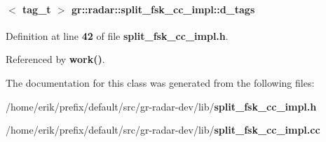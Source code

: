 \paragraph[{d\+\_\+tags}]{$<$ tag\+\_\+t $>$ gr\+::radar\+::split\+\_\+fsk\+\_\+cc\+\_\+impl\+::d\+\_\+tags}\label{classgr_1_1radar_1_1split__fsk__cc__impl_aa34b462a717d11cb34bccadb7fc93cf2}


Definition at line {\bf 42} of file {\bf split\+\_\+fsk\+\_\+cc\+\_\+impl.\+h}.



Referenced by {\bf work()}.



The documentation for this class was generated from the following files\+:\begin{DoxyCompactItemize}
\item 
/home/erik/prefix/default/src/gr-\/radar-\/dev/lib/{\bf split\+\_\+fsk\+\_\+cc\+\_\+impl.\+h}\item 
/home/erik/prefix/default/src/gr-\/radar-\/dev/lib/{\bf split\+\_\+fsk\+\_\+cc\+\_\+impl.\+cc}\end{DoxyCompactItemize}
